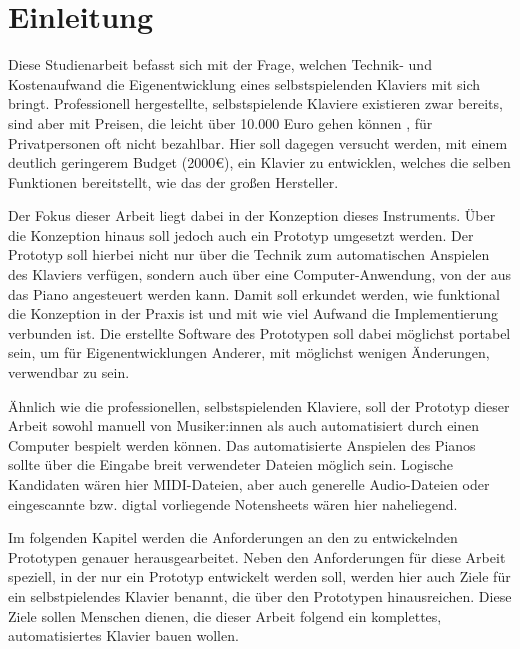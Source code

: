 
\chapter{Einleitung} \label{einleitung}

Diese Studienarbeit befasst sich mit der Frage, welchen Technik- und Kostenaufwand die Eigenentwicklung eines selbstspielenden Klaviers mit sich bringt. %
Professionell hergestellte, selbstspielende Klaviere existieren zwar bereits,
sind aber mit Preisen, die leicht über 10.000 Euro gehen können \cite{YamahaU1}, für Privatpersonen oft nicht bezahlbar.
Hier soll dagegen versucht werden, mit einem deutlich geringerem Budget (2000€), ein Klavier zu entwicklen, welches die selben Funktionen bereitstellt, wie das der großen Hersteller.


Der Fokus dieser Arbeit liegt dabei in der Konzeption dieses Instruments.
Über die Konzeption hinaus soll jedoch auch ein Prototyp umgesetzt werden.
Der Prototyp soll hierbei nicht nur über die Technik zum automatischen Anspielen des Klaviers verfügen, sondern auch über eine Computer-Anwendung, von der aus das Piano angesteuert werden kann.
Damit soll erkundet werden, wie funktional die Konzeption in der Praxis ist und mit wie viel Aufwand die Implementierung verbunden ist.
Die erstellte Software des Prototypen soll dabei möglichst portabel sein, um für Eigenentwicklungen Anderer, mit möglichst wenigen Änderungen, verwendbar zu sein.

Ähnlich wie die professionellen, selbstspielenden Klaviere, soll der Prototyp dieser Arbeit sowohl manuell von Musiker:innen als auch automatisiert durch einen Computer bespielt werden können.
Das automatisierte Anspielen des Pianos sollte über die Eingabe breit verwendeter Dateien möglich sein.
Logische Kandidaten wären hier \ac{MIDI}-Dateien, aber auch generelle Audio-Dateien oder eingescannte bzw. digtal vorliegende Notensheets wären hier naheliegend.


Im folgenden Kapitel werden die Anforderungen an den zu entwickelnden Prototypen genauer herausgearbeitet.
Neben den Anforderungen für diese Arbeit speziell, in der nur ein Prototyp entwickelt werden soll,
werden hier auch Ziele für ein selbstpielendes Klavier benannt, die über den Prototypen hinausreichen.
Diese Ziele sollen Menschen dienen, die dieser Arbeit folgend ein komplettes, automatisiertes Klavier bauen wollen.


